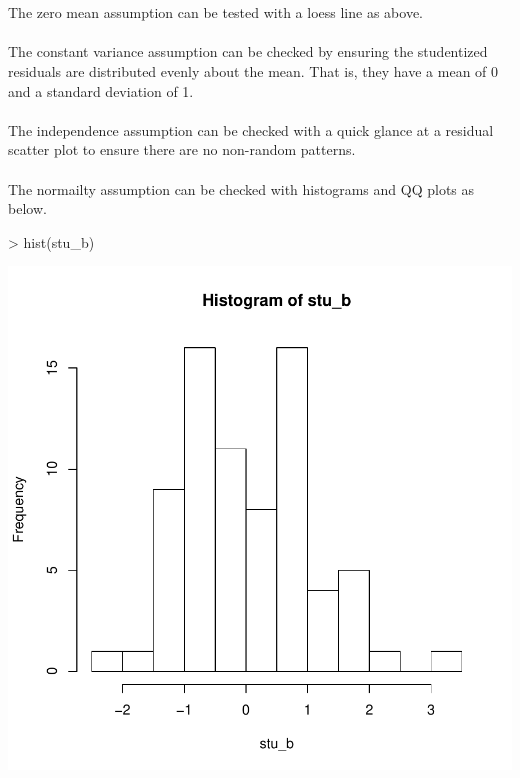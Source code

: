 \documentclass{article}
\begin{document}
\\\\
The zero mean assumption can be tested with a loess line as above. 
\\\\
The constant variance assumption can be checked by ensuring the studentized residuals are distributed evenly about the mean. That is, they have a mean of 0 and a standard deviation of 1. 
\\\\
The independence assumption can be checked with a quick glance at a residual scatter plot to ensure there are no non-random patterns. 
\\\\
The normailty assumption can be checked with histograms and QQ plots as below.

\begin{Schunk}
\begin{Sinput}
> hist(stu_b)
\end{Sinput}
\end{Schunk}
\includegraphics{RegressionFinal-005}
\end{document}
